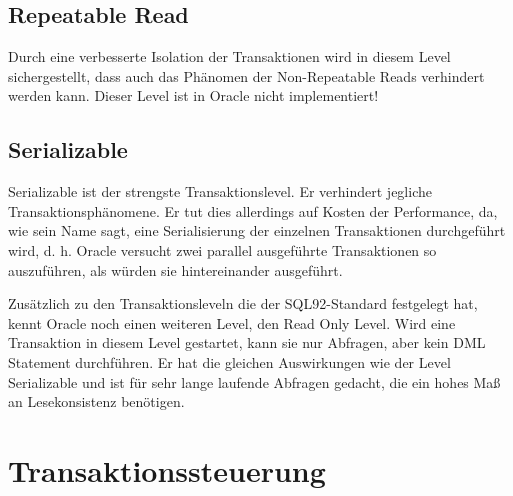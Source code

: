       \subsection{Repeatable Read}
        Durch eine verbesserte Isolation der Transaktionen wird in diesem Level sichergestellt, dass auch das Phänomen der Non-Repeatable Reads verhindert werden kann. Dieser Level ist in Oracle nicht implementiert!
      \subsection{Serializable}
        Serializable ist der strengste Transaktionslevel. Er verhindert jegliche Trans\-akt\-ions\-phä\-no\-me\-ne. Er tut dies allerdings auf Kosten der Performance, da, wie sein Name sagt, eine Serialisierung der einzelnen Transaktionen durchgeführt wird, d. h. Oracle versucht zwei parallel ausgeführte Transaktionen so auszuführen, als würden sie hintereinander ausgeführt.

        Zusätzlich zu den Transaktionsleveln die der SQL92-Standard festgelegt hat, kennt Oracle noch einen weiteren Level, den Read Only Level. Wird eine Transaktion in diesem Level gestartet, kann sie nur Abfragen, aber kein DML Statement durchführen. Er hat die gleichen Auswirkungen wie der Level Serializable und ist für sehr lange laufende Abfragen gedacht, die ein hohes Maß an Lesekonsistenz benötigen.


    \section{Transaktionssteuerung}
